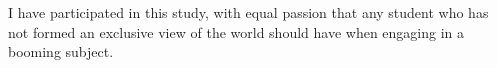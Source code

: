 \documentclass[UTF8]{ctexart}
\begin{document}
I have participated in this study, with equal passion that any student who has not formed an exclusive view of the world should have when engaging in a booming subject. 

\end{document}
